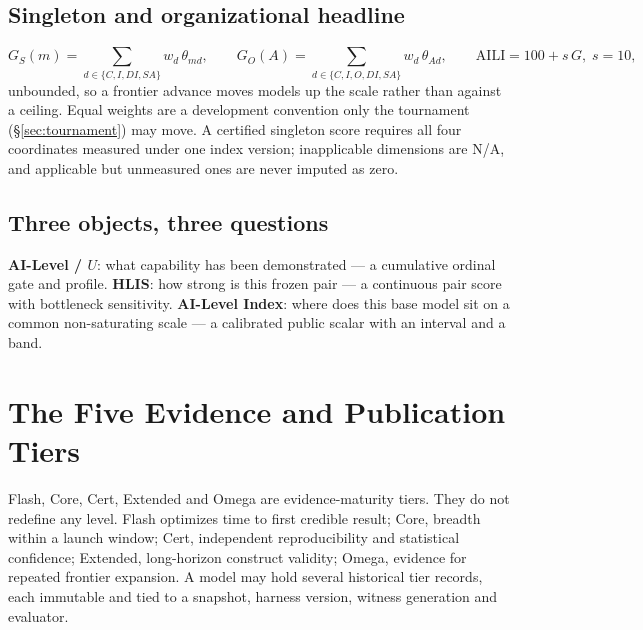 \documentclass[11pt]{article}
\theoremstyle{definition}
\begin{document}
\subsection{Singleton and organizational headline}
\[
G_S(m) = \sum_{d \in \{C, I, DI, SA\}} w_d\,\theta_{md}, \qquad
G_O(A) = \sum_{d \in \{C, I, O, DI, SA\}} w_d\,\theta_{Ad}, \qquad
\mathrm{AILI} = 100 + s\,G, \; s = 10 ,
\]
unbounded, so a frontier advance moves models up the scale rather than against a ceiling. Equal weights are a development convention only the tournament (\S\ref{sec:tournament}) may move. A certified singleton score requires all four coordinates measured under one index version; inapplicable dimensions are N/A, and applicable but unmeasured ones are never imputed as zero.

\subsection{Three objects, three questions}
\textbf{AI-Level / $U$}: what capability has been demonstrated --- a cumulative ordinal gate and profile. \textbf{HLIS}: how strong is this frozen pair --- a continuous pair score with bottleneck sensitivity. \textbf{AI-Level Index}: where does this base model sit on a common non-saturating scale --- a calibrated public scalar with an interval and a band.

\section{The Five Evidence and Publication Tiers}\label{sec:tiers}

Flash, Core, Cert, Extended and Omega are evidence-maturity tiers. They do not redefine any level. Flash optimizes time to first credible result; Core, breadth within a launch window; Cert, independent reproducibility and statistical confidence; Extended, long-horizon construct validity; Omega, evidence for repeated frontier expansion. A model may hold several historical tier records, each immutable and tied to a snapshot, harness version, witness generation and evaluator.
\end{document}
